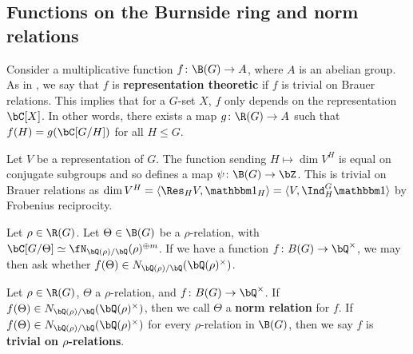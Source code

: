 \subsection{Functions on the Burnside ring and norm relations}

Consider a multiplicative function $f \colon \B(G) \to A$, where $A$ is an abelian group. As in \cite{reg-const}, we say that $f$ is \textbf{representation theoretic} if $f$ is trivial on Brauer relations. This implies that for a $G$-set $X$, $f$ only depends on the representation $\bC[X]$. In other words, there exists a map $g \colon \R(G) \to A$ such that $f(H) = g(\bC[G / H])$ for all $H \leq G$. 

\begin{example}
  Let $V$ be a representation of $G$. The function sending $H \mapsto \dim V^H$ is equal on conjugate subgroups and so defines a map $\psi \colon \B(G) \to \bZ$. This
  is trivial on Brauer relations as $\dim V^H = \langle \Res_{H} V , \trivial_H \rangle = \langle V, \Ind_{H}^G \trivial \rangle$ by Frobenius reciprocity.
\end{example}

Let $\rho \in \R(G)$. Let $\Theta \in \B(G)$ be a $\rho$-relation, with $\bC[G / \Theta] \simeq \repnorm{\rho}^{\oplus m}$. If we have a function $f \colon B(G) \to \bQ^{\times}$, we may then ask whether $f(\Theta) \in \fieldnorm{\rho}$. 


\begin{defn}
Let $\rho \in \R(G)$, $\Theta$ a $\rho$-relation, and $f \colon B(G) \to \bQ^{\times}$. If $f(\Theta) \in \fieldnorm{\rho}$, then we call $\Theta$ a \textbf{norm relation} for $f$. 
If $f(\Theta) \in \fieldnorm{\rho}$ for every $\rho$-relation in $\B(G)$, then we say $f$ is \textbf{trivial on $\rho$-relations}.

\end{defn}


